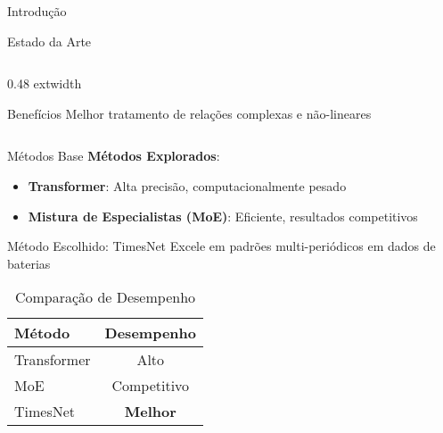 \begin{frame}{Introdução}
\begin{frame}
\begin{frame}{Estado da Arte}
\begin{columns}
\begin{column}{0.48	extwidth}
      \begin{exampleblock}{Benefícios}
        Melhor tratamento de relações complexas e não-lineares
      \end{exampleblock}
    \end{column}
  \end{columns}
  
  \vspace{0.5cm}
  
  \centering
\end{frame}

\begin{frame}{Métodos Base}
  \textbf{Métodos Explorados}:
  
  \begin{itemize}
    \item \textbf{Transformer}: Alta precisão, computacionalmente pesado
    \item \textbf{Mistura de Especialistas (MoE)}: Eficiente, resultados competitivos
  \end{itemize}
  
  \vspace{0.5cm}
  
  \begin{block}{Método Escolhido: TimesNet}
    Excele em padrões multi-periódicos em dados de baterias
  \end{block}
  
  \vspace{0.5cm}
  
  \begin{table}
    \centering
    \caption{Comparação de Desempenho}
    \begin{tabular}{lc}
      \toprule
      \textbf{Método} & \textbf{Desempenho} \\
      \midrule
      Transformer & Alto \\
      MoE & Competitivo \\
      TimesNet & \textbf{Melhor} \\
      \bottomrule
    \end{tabular}
  \end{table}
\end{frame}


\end{frame}
\end{frame}
